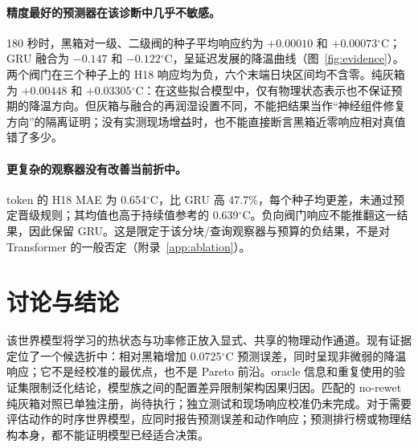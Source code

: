 \documentclass{article}
\newcommand{\degc}{\ensuremath{^{\circ}\mathrm{C}}}
\begin{document}
\paragraph{精度最好的预测器在该诊断中几乎不敏感。}
180 秒时，黑箱对一级、二级阀的种子平均响应约为 $+0.00010$ 和 $+0.00073$\degc{}；GRU 融合为 $-0.147$ 和 $-0.122$\degc{}，呈延迟发展的降温曲线（图~\ref{fig:evidence}）。两个阀门在三个种子上的 H18 响应均为负，六个末端日块区间均不含零。纯灰箱为 $+0.00448$ 和 $+0.03305$\degc{}：在这些拟合模型中，仅有物理状态表示也不保证预期的降温方向。但灰箱与融合的再润湿设置不同，不能把结果当作“神经组件修复方向”的隔离证明；没有实测现场增益时，也不能直接断言黑箱近零响应相对真值错了多少。

\paragraph{更复杂的观察器没有改善当前折中。}
token 的 H18 MAE 为 0.654\degc{}，比 GRU 高 47.7\%，每个种子均更差，未通过预定晋级规则；其均值也高于持续值参考的 0.639\degc{}。负向阀门响应不能推翻这一结果，因此保留 GRU。这是限定于该分块/查询观察器与预算的负结果，不是对 Transformer 的一般否定（附录~\ref{app:ablation}）。

\section{讨论与结论}
该世界模型将学习的热状态与功率修正放入显式、共享的物理动作通道。现有证据定位了一个候选折中：相对黑箱增加 0.0725\degc{} 预测误差，同时呈现非微弱的降温响应；它不是经校准的最优点，也不是 Pareto 前沿。oracle 信息和重复使用的验证集限制泛化结论，模型族之间的配置差异限制架构因果归因。匹配的 no-rewet 纯灰箱对照已单独注册，尚待执行；独立测试和现场响应校准仍未完成。对于需要评估动作的时序世界模型，应同时报告预测误差和动作响应；预测排行榜或物理结构本身，都不能证明模型已经适合决策。

\label{maintext:end}
\clearpage


\clearpage
\appendix

\end{document}

